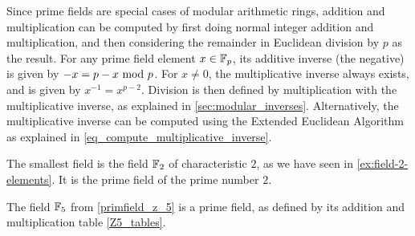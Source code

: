 Since prime fields are special cases of modular arithmetic rings, addition and multiplication can be computed by first doing normal integer addition and multiplication, and then considering the remainder in Euclidean division by $p$ as the result. For any prime field element $x\in \mathbb{F}_p$, its additive inverse (the negative) is given by $-x=p-x \text{ mod } p$. For $x\neq 0$, the multiplicative inverse always exists, and is given by $x^{-1}=x^{p-2}$. Division is then defined by multiplication with the multiplicative inverse, as explained in \secname{} \ref{sec:modular_inverses}. Alternatively, the multiplicative inverse can be computed using the Extended Euclidean Algorithm as explained in \eqref{eq_compute_multiplicative_inverse}.

\begin{example}
The smallest field is the field $\mathbb{F}_2$ of characteristic $2$, as we have seen in \examplename{}  \ref{ex:field-2-elements}. It is the prime field of the prime number $2$.
\end{example}
\begin{example}
The field $\mathbb{F}_5$ from \examplename{} \ref{primfield_z_5} is a prime field, as defined by its addition and multiplication table \eqref{Z5_tables}. 
\end{example}

